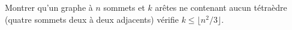 Montrer qu'un graphe à $n$ sommets et $k$ arêtes ne contenant aucun tétraèdre (quatre sommets deux à deux adjacents) vérifie $k \leq \lfloor n^2/3 \rfloor$.
